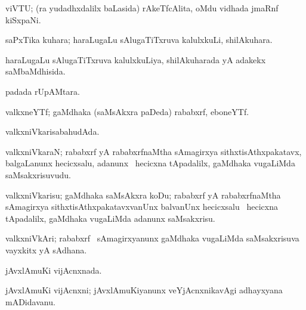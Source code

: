 {{{{{{{{{{{{{{\bentry
{} 
\gl{\nA}
\expl{}
\bmng
 viVTU; (ra yudadhxdalilx baLasida) rAkeTfcAlita, oMdu vidhada jmaRnf kiSxpaNi. 
\emng
\eentry

\bentry
{} 
\gl{\nA}
\expl{}
\bmng
 saPxTika kuhara; haraLugaLu sAlugaTiTxruva kalulxkuLi, shilAkuhara. 
\emng
\eentry

\bentry 
{} 
\gl{\gu}
\expl{}
\bmng
 haraLugaLu sAlugaTiTxruva kalulxkuLiya, shilAkuharada yA adakekx saMbaMdhisida. 
\emng
\eentry

\bentry
{} 
\gl{\gu}
\expl{}
\bmng
\emng
\eentry

\bentry 
{} 
\gl{\gu}
\expl{}
\bmng
  padada rUpAMtara. 
\emng
\eentry

\bentry
{} 
\gl{\sakirx}
\expl{}
\bmng
\emng
\eentry

\bentry
{}
\gl{\nA}
\expl{}
\bmng
 valkxneYTf; gaMdhaka (saMsAkxra paDeda) rababxrf, eboneYTf. 
\emng
\eentry

\bentry 
{} 
\gl{\gu}
\expl{}
\bmng
 valkxniVkarisabahudAda. 
\emng
\eentry

\bentry 
{} 
\gl{\nA}
\expl{}
\bmng
 valkxniVkaraN; rababxrf yA rababxrfnaMtha sAmagirxya sithxtisAthxpakatavx, balgaLanunx hecicxsalu, adanunx \kanmu\ hecicxna tApadalilx, gaMdhaka \mo vugaLiMda saMsakxrisuvudu. 
\emng
\eentry

\bentry
{} 
\gl{\sakirx}
\expl{}
\bmng
 valkxniVkarisu; gaMdhaka saMsAkxra koDu; rababxrf yA rababxrfnaMtha sAmagirxya sithxtisAthxpakatavxvanUnx balvanUnx hecicxsalu \kanmu\ hecicxna tApadalilx, gaMdhaka \mo vugaLiMda adanunx saMsakxrisu. 
\emng
\eentry

\bentry 
{} 
\gl{\nA}
\expl{}
\bmng
 valkxniVkAri; rababxrf \mo\ sAmagirxyanunx gaMdhaka \mo vugaLiMda saMsakxrisuva vayxkitx yA sAdhana. 
\emng
\eentry

\bentry
{} 
\gl{\gu}
\expl{}
\bmng
 jAvxlAmuKi vijAcnxnada. 
\emng
\eentry

\bentry
{} 
\gl{\nA}
\expl{}
\bmng
 jAvxlAmuKi vijAcnxni; jAvxlAmuKiyanunx veYjAcnxnikavAgi adhayxyana mADidavanu. 
\emng
\eentry

}}}}}}}}}}}}}}
